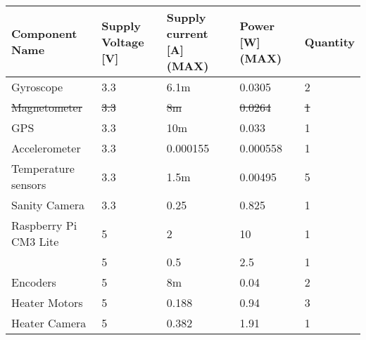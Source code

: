 
\begin{center}
\begin{table}[H]
\begin{tabular}{|m{}|m{}|m{}|m{}|m{}|}
\hline
\textbf{Component Name} & \textbf{Supply Voltage {[}V{]}} & \textbf{Supply current {[}A{]} (MAX)} & \textbf{Power {[}W{]} (MAX)} & \textbf{Quantity} \\ \hline
Gyroscope               & 3.3                             & 6.1m                                & 0.0305                       & 2                 \\ \hline
\rowcolor{yellow} \st{Magnetometer}            & \st{3.3}                             & \st{8m}                     & \st{0.0264}                       & \st{1} \\ \hline
GPS                     & 3.3                             & 10m                                 & 0.033                        & 1                 \\ \hline
Accelerometer           & 3.3                             & 0.000155                            & 0.000558                     & 1                 \\ \hline
Temperature sensors     & 3.3                             & 1.5m                                & 0.00495                      & 5                 \\ \hline
Sanity Camera           & 3.3                             & 0.25                                & 0.825                        & 1                 \\ \hline
Raspberry Pi CM3 Lite   & 5                               & 2                                   & 10                           & 1                 \\ \hline
\rowcolor{yellow}{Raspberry Pi zero}	 	& 5   					& 0.5
& 2.5						   & 1				\\ \hline
Encoders                & 5                               & 8m                                  & 0.04                         & 2                 \\ \hline
Heater Motors           & 5                               & 0.188                               & 0.94                         & 3                 \\ \hline
Heater Camera           & 5                               & 0.382                               & 1.91                         & 1                 \\ \hline

\end{tabular}
\end{table}
\end{center}
